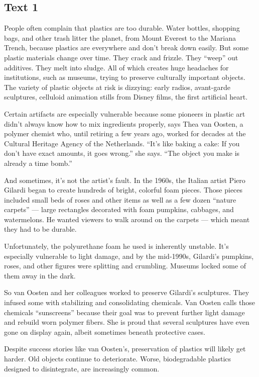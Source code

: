 \documentclass[UTF8,11pt]{ctexart}
\begin{document}
\subsection*{\textbf{Text 1}}


People often complain that plastics are too durable. Water bottles, shopping bags, and other trash litter the planet, from Mount Everest to the Mariana Trench, because plastics are everywhere and don’t break down easily. But some plastic materials change over time. They crack and frizzle. They “weep” out additives. They melt into sludge. All of which creates huge headaches for institutions, such as museums, trying to preserve culturally important objects. The variety of plastic objects at risk is dizzying: early radios, avant-garde sculptures, celluloid animation stills from Disney films, the first artificial heart.


Certain artifacts are especially vulnerable because some pioneers in plastic art didn’t always know how to mix ingredients properly, says Thea van Oosten, a polymer chemist who, until retiring a few years ago, worked for decades at the Cultural Heritage Agency of the Netherlands. “It’s like baking a cake: If you don’t have exact amounts, it goes wrong.” she says. “The object you make is already a time bomb.”


And sometimes, it’s not the artist’s fault. In the 1960s, the Italian artist Piero Gilardi began to create hundreds of bright, colorful foam pieces. Those pieces included small beds of roses and other items as well as a few dozen “nature carpets” — large rectangles decorated with foam pumpkins, cabbages, and watermelons. He wanted viewers to walk around on the carpets — which meant they had to be durable.


Unfortunately, the polyurethane foam he used is inherently unstable. It’s especially vulnerable to light damage, and by the mid-1990s, Gilardi’s pumpkins, roses, and other figures were splitting and crumbling. Museums locked some of them away in the dark.


So van Oosten and her colleagues worked to preserve Gilardi’s sculptures. They infused some with stabilizing and consolidating chemicals. Van Oosten calls those chemicals “sunscreens” because their goal was to prevent further light damage and rebuild worn polymer fibers. She is proud that several sculptures have even gone on display again, albeit sometimes beneath protective cases.


Despite success stories like van Oosten’s, preservation of plastics will likely get harder. Old objects continue to deteriorate. Worse, biodegradable plastics designed to disintegrate, are increasingly common.
\end{document}
